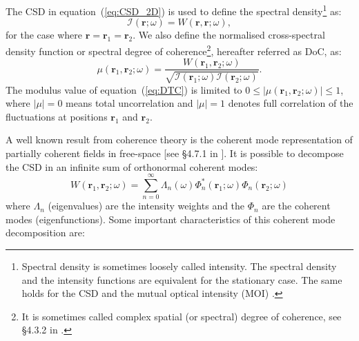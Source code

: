 \documentclass{iucr}              %
\begin{document}
The CSD in equation~(\ref{eq:CSD_2D}) is used to define the spectral density\footnote{Spectral density is sometimes loosely called intensity. The spectral density and the intensity functions are equivalent for the 
stationary case. The same holds for the CSD and the mutual optical intensity (MOI) \cite{mandel_wolf}.} as:
\begin{equation}\label{eq:intensity}
    \mathcal{I}(\textbf{r};\omega)=W(\textbf{r},\textbf{r};\omega),
\end{equation}
for the case where $\textbf{r}=\textbf{r}_1=\textbf{r}_2$. We also define the normalised cross-spectral density function or spectral degree of coherence\footnote{It is sometimes called complex spatial (or spectral) degree of coherence, see §4.3.2 in \cite{mandel_wolf}.}, hereafter referred as DoC, as:
\begin{equation}
\mu(\textbf{r}_1,\textbf{r}_2;\omega) = \frac{W(\textbf{r}_1,\textbf{r}_2;\omega)}{\sqrt{\mathcal{I}(\textbf{r}_1;\omega) \mathcal{I}(\textbf{r}_2;\omega)}}.
\label{eq:DTC}
\end{equation}
The modulus value of equation~(\ref{eq:DTC}) is limited to $0\leq|\mu(\textbf{r}_1,\textbf{r}_2;\omega)|\leq 1$, where $|\mu|=0$ means total uncorrelation and $|\mu|=1$ denotes full correlation of the fluctuations at positions $\textbf{r}_1$ and $\textbf{r}_2$. 

A well known result from coherence theory is the coherent mode representation of partially coherent fields in free-space [see §4.7.1 in \cite{mandel_wolf}]. It is possible to decompose the CSD in an infinite sum of orthonormal coherent modes:
\begin{equation}\label{eq:W2DCMD}
W(\textbf{r}_1,\textbf{r}_2;\omega) = \sum_{n=0}^{\infty} \Lambda_n(\omega) \Phi_{n}^*(\textbf{r}_1;\omega) \Phi_{n}(\textbf{r}_2;\omega)
\end{equation}
where $\Lambda_n$ (eigenvalues) are the intensity weights and the $\Phi_n$ are the coherent modes (eigenfunctions). 
Some important characteristics of this coherent mode decomposition are: 
\end{document}
